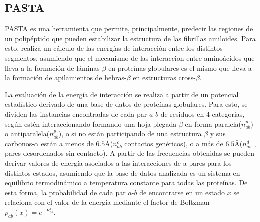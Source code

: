 % 








\subsection{PASTA}\label{pasta}


PASTA \cite{trovato2006insight} es una herramienta que permite, principalmente, predecir las regiones de un polipéptido que pueden estabilizar la estructura de las fibrillas amiloides.
Para esto, realiza un cálculo de las energías de interacción entre los distintos segmentos, asumiendo que el mecanismo de las interaccion entre aminoácidos que lleva a la formación 
de láminas-$\beta$ en proteínas globulares es el mismo que lleva a la formación de apilamientos de hebras-$\beta$ en estructuras cross-$\beta$.

La evaluación de la energía de interacción se realiza a partir de un potencial estadístico derivado de una base de datos de proteínas globulares.
Para esto, se dividen las instancias encontradas de cada par $a$-$b$ de residuos en 4 categorias, según estén interaccionando formando una hoja plegada-$\beta$ en forma paralela($n_{ab}^p$) o antiparalela($n_{ab}^p$), 
o si no están participando de una estructura $\beta$ y sus carbonos-$\alpha$ están a menos de $6.5$\AA ($n_{ab}^c$ contactos genéricos), o a más de $6.5$\AA ($n_{ab}^d$ , pares desordenados sin contacto). 
A partir de las frecuencias obtenidas se pueden derivar valores de energía asociados a las interacciones de a pares para los distintos estados, asumiendo que la base de datos analizada es un sistema en equilibrio termodinámico 
a temperatura constante para todas las proteínas.
De esta forma, la probabilidad de cada par $a$-$b$ de encontrarse en un estado $x$ se relaciona con el valor de la energía mediante el factor de Boltzman $p_{ab}(x)= e^{-E_{ab}^x}$. 

